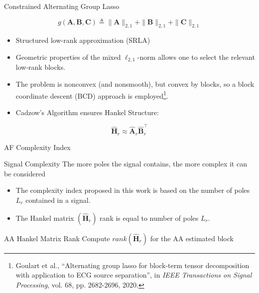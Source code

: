 \documentclass{beamer}
\begin{document}
	\begin{frame}{Constrained Alternating Group Lasso}
		
		\begin{equation}
			g(\mathbf{A}, \mathbf{B}, \mathbf{C}) \triangleq 
						 \| \mathbf{A} \|_{2,1} + \| \mathbf{B} \|_{2,1} + \| \mathbf{C} \|_{2,1}
	 \end{equation}

		\begin{itemize}
			\item Structured low-rank approximation (SRLA)
			\item Geometric properties of the mixed $\ell_{2,1}$-norm allows one to select the relevant low-rank blocks.
			\item The problem is nonconvex (and nonsmooth), but convex by blocks, so a block coordinate descent (BCD) approach is employed\footnote{Goulart et al., ``Alternating group lasso for block-term tensor decomposition with application to ECG source separation'', in \textit{IEEE Transactions on Signal Processing}, vol. 68, pp. 2682-2696, 2020.}.			
			\item Cadzow's Algorithm ensures Hankel Structure:
		\end{itemize}
		\begin{equation}
			\hat{\mathbf{H}}_r \approx \hat{\mathbf{A}}_r \hat{\mathbf{B}}^{\intercal}_r
	 \end{equation}

	\end{frame}

	\begin{frame}{AF Complexity Index}
		
		\begin{block}{Signal Complexity}
			The more poles the signal contains, the more complex it can be considered
		\end{block}
		
		\begin{itemize}
			\item The complexity index proposed in this work is based on the number of poles $L_{r}$ contained in a signal. 
			\item The Hankel matrix $(\hat{\mathbf{H}}_r)$ rank is equal to number of poles $L_{r}$.
		\end{itemize}
		
		\begin{block}{AA Hankel Matrix Rank}
			Compute $rank(\hat{\mathbf{H}}_r)$ for the AA estimated block
		\end{block}

	\end{frame}
	
\end{document}
